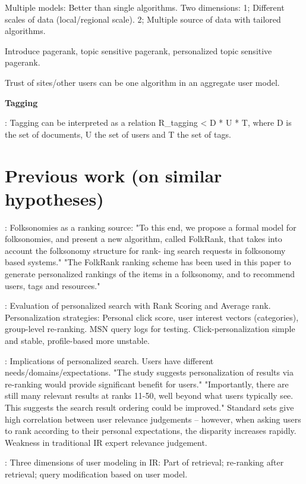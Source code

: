 Multiple models: Better than single algorithms. Two dimensions: 
1; Different scales of data (local/regional scale).
2; Multiple source of data with tailored algorithms.

Introduce pagerank, topic sensitive pagerank, personalized topic sensitive pagerank.

Trust of sites/other users can be one algorithm in an aggregate user model.

\textbf{Tagging}

\cite[p4]{Noll2007}: 
Tagging can be interpreted as a relation R\_tagging < D * U * T, where D is the set of documents, U the set of users and T the set of tags.

\section{Previous work (on similar hypotheses)}

\cite[p2]{Hotho}: Folksonomies as a ranking source: 
"To this end, we propose a formal model for folksonomies, and present a new algorithm, called FolkRank, that takes into account the folksonomy structure for rank- ing search requests in folksonomy based systems."
"The FolkRank ranking scheme has been used in this paper to generate personalized rankings of the items in a folksonomy, and to recommend users, tags and resources."

\cite{Dou2007}: Evaluation of personalized search with Rank Scoring and Average rank. 
Personalization strategies: Personal click score, user interest vectors (categories), 
group-level re-ranking. MSN query logs for testing. Click-personalization simple and stable, 
profile-based more unstable.

\cite[p2]{Teevan2005a}: Implications of personalized search. Users have different needs/domains/expectations.
"The study suggests personalization of results via re-ranking would provide significant benefit for users."
"Importantly, there are still many relevant results at ranks 11-50, well beyond what users typically see. 
This suggests the search result ordering could be improved."
Standard sets give high correlation between user relevance judgements -- however, when asking users
to rank according to their personal expectations, the disparity increases rapidly. Weakness in 
traditional IR expert relevance judgement.

\cite[p6]{Micarelli2007}: Three dimensions of user modeling in IR: Part of retrieval; re-ranking after
retrieval; query modification based on user model.

